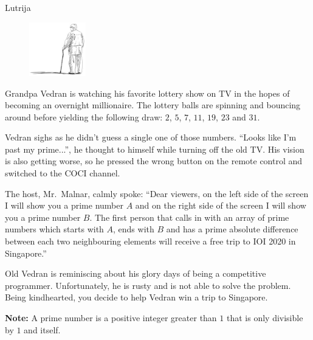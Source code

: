 \begin{statement}[
  problempoints=70,
  timelimit=2 seconds,
  memorylimit=512 MiB,
]{Lutrija}

\setlength\intextsep{-0.1cm}
\begin{figure}
\centering
\includegraphics[width=0.22\textwidth]{img/vedran_kurdija.png}
\end{figure}


Grandpa Vedran is watching his favorite lottery show on TV in the hopes of
becoming an overnight millionaire. The lottery balls are spinning and bouncing
around before yielding the following draw: $2$, $5$, $7$, $11$, $19$, $23$ and
$31$.

Vedran sighs as he didn't guess a single one of those numbers. ``Looks like
I'm past my prime...'', he thought to himself while turning off the old
TV. His vision is also getting worse, so he pressed the wrong button on the
remote control and switched to the COCI channel.

The host, Mr.\ Malnar, calmly spoke: ``Dear viewers, on the left side of the screen
I will show you a prime number $A$ and on the right side of the screen I will
show you a prime number $B$. The first person that calls in with an array of
prime numbers which starts with $A$, ends with $B$ and has a prime absolute
difference between each two neighbouring elements will receive a free trip
to IOI 2020 in Singapore.''


Old Vedran is reminiscing about his glory days of being a competitive programmer.
Unfortunately, he is rusty and is not able to solve the problem. Being
kindhearted, you decide to help Vedran win a trip to Singapore.

\textbf{Note:} A prime number is a positive integer greater than $1$ that is
only divisible by $1$ and itself.



\end{statement}
